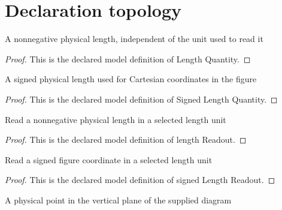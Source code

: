 \section{Declaration topology}
\begin{definition}
  \label{def:physics:phyx-mini-0329:phyxminiproblems-problemphyxmini0329-lengthquantity}
  A nonnegative physical length, independent of the unit used to read it
\end{definition}
\begin{proof}
  This is the declared model definition of Length Quantity.
\end{proof}
\begin{definition}
  \label{def:physics:phyx-mini-0329:phyxminiproblems-problemphyxmini0329-signedlengthquantity}
  A signed physical length used for Cartesian coordinates in the figure
\end{definition}
\begin{proof}
  This is the declared model definition of Signed Length Quantity.
\end{proof}
\begin{definition}
  \label{def:physics:phyx-mini-0329:phyxminiproblems-problemphyxmini0329-lengthreadout}
  Read a nonnegative physical length in a selected length unit
\end{definition}
\begin{proof}
  This is the declared model definition of length Readout.
\end{proof}
\begin{definition}
  \label{def:physics:phyx-mini-0329:phyxminiproblems-problemphyxmini0329-signedlengthreadout}
  Read a signed figure coordinate in a selected length unit
\end{definition}
\begin{proof}
  This is the declared model definition of signed Length Readout.
\end{proof}
\begin{definition}
  \label{def:physics:phyx-mini-0329:phyxminiproblems-problemphyxmini0329-planepoint}
  A physical point in the vertical plane of the supplied diagram
\end{definition}
